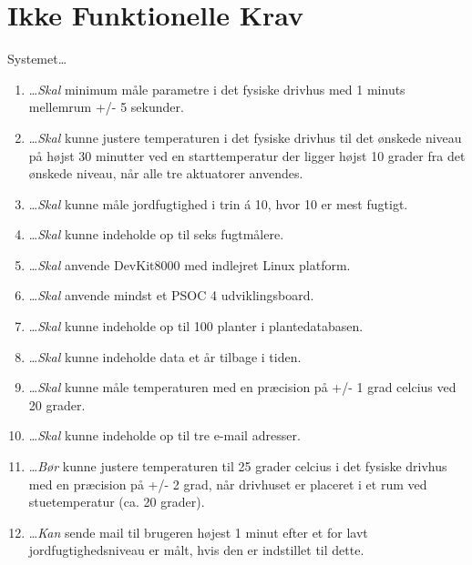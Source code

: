 \section{Ikke Funktionelle Krav}
Systemet\ldots
\begin{enumerate}\itemsep1pt \parskip0pt 
	\item \ldots \emph{Skal} minimum måle parametre i det fysiske drivhus med 1 minuts mellemrum +/- 5 sekunder.
	\item \ldots \emph{Skal} kunne justere temperaturen i det fysiske drivhus til det ønskede niveau på højst 30 minutter ved en starttemperatur der ligger højst 10 grader fra det ønskede niveau, når alle tre aktuatorer anvendes.
	\item \ldots \emph{Skal} kunne måle jordfugtighed i trin á 10, hvor 10 er mest fugtigt. 
	\item \ldots \emph{Skal} kunne indeholde op til seks fugtmålere.
	\item \ldots \emph{Skal} anvende DevKit8000 med indlejret Linux platform.
	\item \ldots \emph{Skal} anvende mindst et PSOC 4 udviklingsboard.
	\item \ldots \emph{Skal} kunne indeholde op til 100 planter i plantedatabasen.
	\item \ldots \emph{Skal} kunne indeholde data et år tilbage i tiden.
	\item \ldots \emph{Skal} kunne måle temperaturen med en præcision på +/- 1 grad celcius ved 20 grader.
	\item \ldots \emph{Skal} kunne indeholde op til tre e-mail adresser.
	\item \ldots \emph{Bør} kunne justere temperaturen til 25 grader celcius i det fysiske drivhus med en præcision på +/- 2 grad, når drivhuset er placeret i et rum ved stuetemperatur (ca. 20 grader).
	\item \ldots \emph{Kan} sende mail til brugeren højest 1 minut efter et for lavt jordfugtighedsniveau er målt, hvis den er indstillet til dette.
\end{enumerate}


